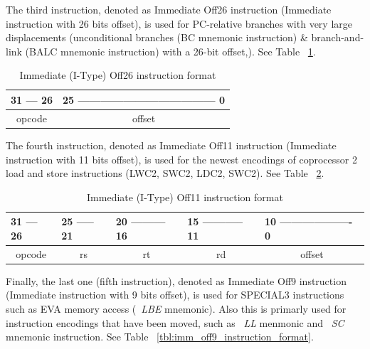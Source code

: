 \documentclass[
  oneside,
  11pt, a4paper,
  footinclude=true,
  headinclude=true,
  cleardoublepage=empty
]{scrbook}
\begin{document}

The third instruction, denoted as Immediate Off26 instruction (Immediate instruction with 26 bits offset), is used for PC-relative branches with very large displacements (unconditional branches (BC mnemonic instruction) \& branch-and-link (BALC mnemonic instruction) with a 26-bit offset,).
See Table ~\ref{tbl:imm_off26_instruction}.

\begin{table}[h!]
\centering
\begin{tabular}{l|lll}
31 --- 26                    & \multicolumn{3}{l}{25 ------------------------------------ 0} \\ \hline
\multicolumn{1}{|c|}{opcode} & \multicolumn{3}{c|}{offset}                                   \\ \hline
\end{tabular}
\caption{Immediate (I-Type) Off26 instruction format}
\label{tbl:imm_off26_instruction}
\end{table}

The fourth instruction, denoted as Immediate Off11 instruction (Immediate instruction with 11 bits offset), is used for the newest encodings of coprocessor 2 load and store instructions (LWC2, SWC2, LDC2, SWC2).
See Table ~\ref{tbl:imm_off11_instruction_format}.

\begin{table}[h!]
\centering
\begin{tabular}{l|l|l|l|l}
31 --- 26                    & 25 ----- 21             & 20 --------- 16         & 15 ----------- 11       & 10 ------------------- 0    \\ \hline
\multicolumn{1}{|c|}{opcode} & \multicolumn{1}{c|}{rs} & \multicolumn{1}{c|}{rt} & \multicolumn{1}{c|}{rd} & \multicolumn{1}{c|}{offset} \\ \hline
\end{tabular}
\caption{Immediate (I-Type) Off11 instruction format}
\label{tbl:imm_off11_instruction_format}
\end{table}

Finally, the last one (fifth instruction), denoted as Immediate Off9 instruction (Immediate instruction with 9 bits offset), is used for SPECIAL3 instructions such as EVA memory access (~\textit{LBE} mnemonic). Also this is primarly used for instruction encodings that have been moved, such as ~\textit{LL} menmonic and ~\textit{SC} mnemonic instruction.
See Table ~\ref{tbl:imm_off9_instruction_format}.
\end{document}
